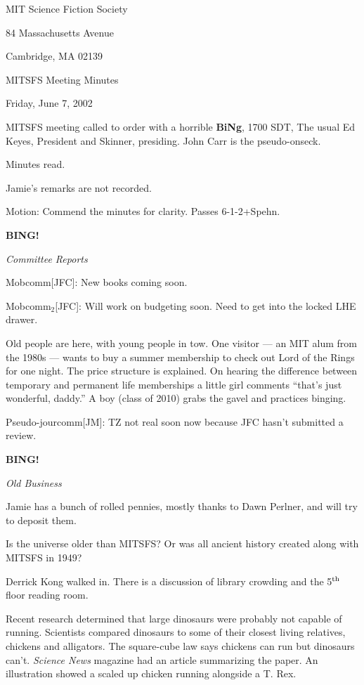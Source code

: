 \documentclass[12pt]{article}
\newcommand{\bing}{{\bf BING!} }
\newcommand{\goto}[1]{\bing \vskip 12pt \centerline{{\em{#1}}}}
\begin{document}
\begin{center}

MIT Science Fiction Society 

84 Massachusetts Avenue

Cambridge, MA 02139

\vspace{12pt}

MITSFS Meeting Minutes 

Friday, June 7, 2002

\end{center}
 
\vspace{18pt}

\setlength{\parskip}{6pt}

\noindent
MITSFS meeting called to order with a horrible {\bf BiNg}, 1700 SDT,
The usual Ed Keyes, President and Skinner, presiding.
John Carr is the pseudo-onseck.

Minutes read.

Jamie's remarks are not recorded.

Motion: Commend the minutes for clarity.  Passes \hbox{6-1-2+Spehn}.

\goto{Committee Reports}

Mobcomm[JFC]: New books coming soon.

Mobcomm$_2$[JFC]: Will work on budgeting soon.  Need to get into the
locked LHE drawer.

Old people are here, with young people in tow.  One visitor --- an MIT
alum from the 1980s --- wants to buy a summer membership to check out
Lord of the Rings for one night.  The price structure is explained.
On hearing the difference between temporary and permanent life
memberships a little girl comments ``that's just wonderful, daddy.''
A boy (class of 2010) grabs the gavel and practices binging.

Pseudo-jourcomm[JM]: TZ not real soon now because JFC hasn't submitted
a review.

\goto{Old Business}

Jamie has a bunch of rolled pennies, mostly thanks to Dawn Perlner,
and will try to deposit them.

Is the universe older than MITSFS?  Or was all ancient history
created along with MITSFS in 1949?

Derrick Kong walked in.  There is a discussion of library crowding
and the 5$^{\rm th}$ floor reading room.

Recent research determined that large dinosaurs were probably not
capable of running.  Scientists compared dinosaurs to some of their
closest living relatives, chickens and alligators.  The square-cube
law says chickens can run but dinosaurs can't.  {\em Science News}
magazine had an article summarizing the paper.  An illustration showed
a scaled up chicken running alongside a T. Rex.
\end{document}
